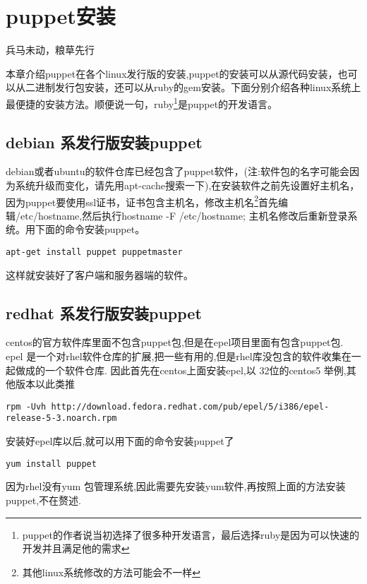 \chapter{\msyh puppet安装}
\begin{center}
\kai
兵马未动，粮草先行
\end{center}

\song 本章介绍puppet在各个linux发行版的安装,puppet的安装可以从源代码安装，也可以从二进制发行包安装，还可以从ruby的gem安装。下面分别介绍各种linux系统上最便捷的安装方法。顺便说一句，ruby\footnote{\fsong\tiny puppet的作者说当初选择了很多种开发语言，最后选择ruby是因为可以快速的开发并且满足他的需求}是puppet的开发语言。
\song
\section{\msyh debian 系发行版安装puppet}
debian或者ubuntu的软件仓库已经包含了puppet软件，(注:软件包的名字可能会因为系统升级而变化，请先用apt-cache搜索一下),在安装软件之前先设置好主机名，因为puppet要使用ssl证书，证书包含主机名，修改主机名\footnote{\fsong\tiny 其他linux系统修改的方法可能会不一样}首先编辑/etc/hostname,然后执行hostname -F /etc/hostname; 主机名修改后重新登录系统。用下面的命令安装puppet。
\msyh
\begin{lstlisting}
apt-get install puppet puppetmaster
\end{lstlisting}
\song
这样就安装好了客户端和服务器端的软件。

\section{\msyh redhat 系发行版安装puppet}

centos的官方软件库里面不包含puppet包,但是在epel项目里面有包含puppet包. epel 是一个对rhel软件仓库的扩展,把一些有用的,但是rhel库没包含的软件收集在一起做成的一个软件仓库.
因此首先在centos上面安装epel,以 32位的centos5 举例,其他版本以此类推
\msyh
\begin{lstlisting}
rpm -Uvh http://download.fedora.redhat.com/pub/epel/5/i386/epel-release-5-3.noarch.rpm
\end{lstlisting}
\song
安装好epel库以后,就可以用下面的命令安装puppet了
\msyh
\begin{lstlisting}
yum install puppet
\end{lstlisting}
\song
因为rhel没有yum 包管理系统,因此需要先安装yum软件,再按照上面的方法安装puppet,不在赘述.



